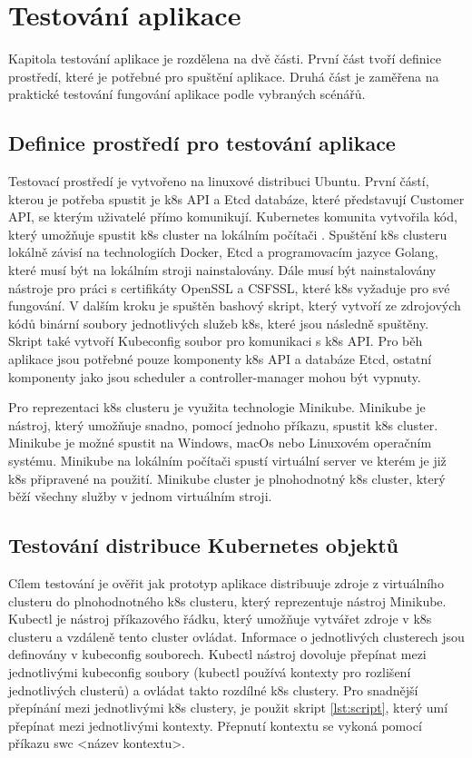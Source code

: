 \chapter{Testování aplikace}
Kapitola testování aplikace je rozdělena na dvě části. První část tvoří definice prostředí, které je potřebné pro spuštění aplikace. Druhá část je zaměřena na praktické testování fungování aplikace podle vybraných scénářů. 
\section{Definice prostředí pro testování aplikace}
Testovací prostředí je vytvořeno na linuxové distribuci Ubuntu. První částí, kterou je potřeba spustit je k8s API a Etcd databáze, které představují Customer API, se kterým uživatelé přímo komunikují. Kubernetes komunita vytvořila kód, který umožňuje \linebreak spustit k8s cluster na lokálním počítači \cite{local-cluster}. Spuštění k8s clusteru lokálně závisí \linebreak na technologiích Docker, Etcd a programovacím jazyce Golang, které musí být na lokálním stroji nainstalovány. Dále musí být nainstalovány nástroje pro práci s certifikáty OpenSSL a CSFSSL, které k8s vyžaduje pro své fungování. V dalším kroku je spuštěn bashový skript, který vytvoří ze zdrojových kódů binární soubory jednotlivých služeb k8s, které jsou následně spuštěny. Skript také vytvoří Kubeconfig soubor pro komunikaci s k8s API. Pro běh aplikace jsou potřebné pouze komponenty k8s API a databáze Etcd, ostatní komponenty jako jsou scheduler a controller-manager mohou být vypnuty.\par 
    Pro reprezentaci k8s clusteru je využita technologie Minikube. Minikube je nástroj, který umožňuje snadno, pomocí jednoho příkazu, spustit k8s cluster. Minikube je možné spustit na Windows, macOs nebo Linuxovém operačním systému. Minikube na lokálním počítači spustí virtuální server ve kterém je již k8s připravené na použití. Minikube cluster je plnohodnotný k8s cluster, který běží všechny služby v jednom virtuálním stroji. \par
\section{Testování distribuce Kubernetes objektů}
    Cílem testování je ověřit jak prototyp aplikace distribuuje zdroje z virtuálního clusteru do plnohodnotného k8s clusteru, který reprezentuje nástroj Minikube. Kubectl je nástroj příkazového řádku, který umožňuje vytvářet zdroje v k8s clusteru a vzdáleně tento cluster ovládat. Informace o jednotlivých clusterech jsou definovány v kubeconfig souborech. Kubectl nástroj dovoluje přepínat mezi jednotlivými kubeconfig soubory (kubectl používá kontexty pro rozlišení jednotlivých clusterů) a ovládat takto rozdílné k8s clustery. Pro snadnější přepínání mezi jednotlivými k8s clustery, je použit skript \ref{lst:script}, který umí přepínat mezi jednotlivými kontexty. Přepnutí kontextu se vykoná pomocí příkazu swc <název kontextu>.  
    
